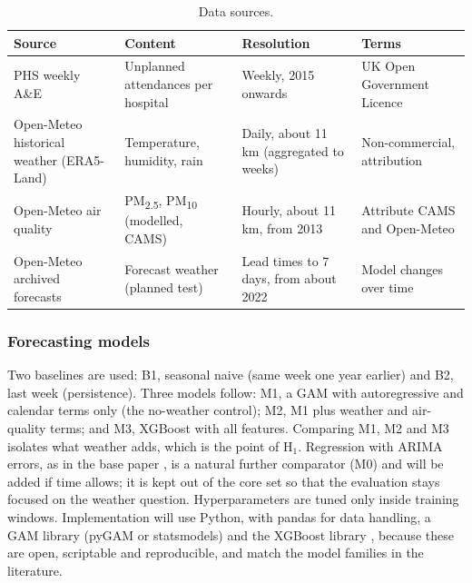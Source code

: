 \documentclass[12pt]{article}
\begin{document}
\begin{table}[h!]
\centering
\small
\begin{tabular}{|p{2.8cm}|p{3.3cm}|p{3.0cm}|p{3.4cm}|}
 \hline
 Source & Content & Resolution & Terms \\
 \hline
 PHS weekly A\&E & Unplanned attendances per hospital & Weekly, 2015 onwards & UK Open Government Licence \\
 Open-Meteo historical weather (ERA5-Land) & Temperature, humidity, rain & Daily, about 11 km (aggregated to weeks) & Non-commercial, attribution \\
 Open-Meteo air quality & PM\textsubscript{2.5}, PM\textsubscript{10} (modelled, CAMS) & Hourly, about 11 km, from 2013 & Attribute CAMS and Open-Meteo \\
 Open-Meteo archived forecasts & Forecast weather (planned test) & Lead times to 7 days, from about 2022 & Model changes over time \\
 \hline
\end{tabular}
\caption{Data sources.}
\label{table:sources}
\end{table}

\subsubsection{Forecasting models}
Two baselines are used: B1, seasonal naive (same week one year earlier) and B2, last week (persistence). Three models follow: M1, a GAM with autoregressive and calendar terms only (the no-weather control); M2, M1 plus weather and air-quality terms; and M3, XGBoost with all features. Comparing M1, M2 and M3 isolates what weather adds, which is the point of H$_1$. Regression with ARIMA errors, as in the base paper \parencite{murtas2022}, is a natural further comparator (M0) and will be added if time allows; it is kept out of the core set so that the evaluation stays focused on the weather question. Hyperparameters are tuned only inside training windows. Implementation will use Python, with pandas for data handling, a GAM library (pyGAM or statsmodels) and the XGBoost library \parencite{chen2016}, because these are open, scriptable and reproducible, and match the model families in the literature.
\end{document}
